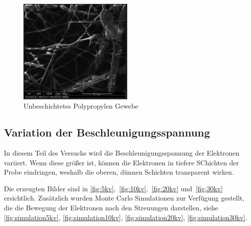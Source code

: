 \documentclass[12pt,english,ngerman]{scrartcl}
\begin{document}
\begin{figure}[H]
	\begin{center}
		\includegraphics[width =0.5\textwidth]{./figures/unbedampft.png}
	\end{center}
	\caption{Unbeschichtetes Polypropylen Gewebe
	}\label{fig:unbeschichtet}
\end{figure}

\subsection{Variation der Beschleunigungsspannung}

In diesem Teil des Versuchs wird die Beschleunigungsspannung der Elektronen
variiert. Wenn diese größer ist, können die Elektronen in tiefere SChichten der
Probe eindringen, weshalb die oberen, dünnen Schichten transparent wirken.

Die erzeugten Bilder sind in \autoref{fig:5kv},~\ref{fig:10kv},~\ref{fig:20kv}
und~\ref{fig:30kv} ersichtlich. Zusätzlich wurden Monte Carlo Simulationen zur
Verfügung gestellt, die die Bewegung der Elektronen nach den Streuungen
darstellen, siehe \autoref{fig:simulation5kv}, \autoref{fig:simulation10kv},
\autoref{fig:simulation20kv}, \autoref{fig:simulation30kv}.
\end{document}
